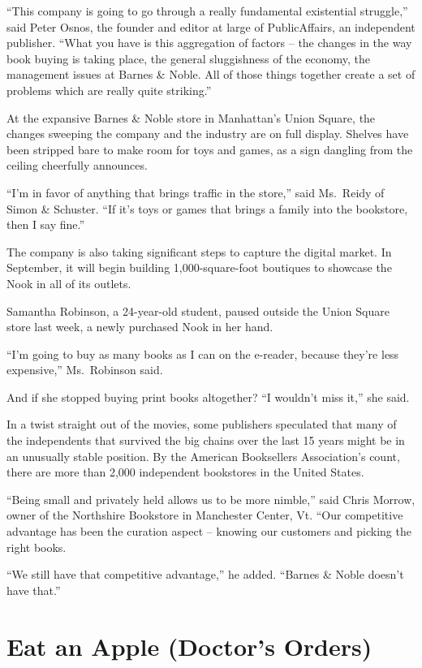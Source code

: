 ﻿\documentclass[12pt]{article}
\begin{document}
``This company is going to go through a really fundamental existential struggle,'' said Peter Osnos,
the founder and editor at large of PublicAffairs, an independent publisher. ``What you have is this
aggregation of factors -- the changes in the way book buying is taking place, the general
sluggishness of the economy, the management issues at Barnes \& Noble. All of those things together
create a set of problems which are really quite striking.''

At the expansive Barnes \& Noble store in Manhattan's Union Square, the changes sweeping the company
and the industry are on full display. Shelves have been stripped bare to make room for toys and
games, as a sign dangling from the ceiling cheerfully announces.

``I'm in favor of anything that brings traffic in the store,'' said Ms.~Reidy of Simon \& Schuster.
``If it's toys or games that brings a family into the bookstore, then I say fine.''

The company is also taking significant steps to capture the digital market. In September, it will
begin building 1,000-square-foot boutiques to showcase the Nook in all of its outlets.

Samantha Robinson, a 24-year-old student, paused outside the Union Square store last week, a newly
purchased Nook in her hand.

``I'm going to buy as many books as I can on the e-reader, because they're less expensive,''
Ms.~Robinson said.

And if she stopped buying print books altogether? ``I wouldn't miss it,'' she said.

In a twist straight out of the movies, some publishers speculated that many of the independents that
survived the big chains over the last 15 years might be in an unusually stable position. By the
American Booksellers Association's count, there are more than 2,000 independent bookstores in the
United States.

``Being small and privately held allows us to be more nimble,'' said Chris Morrow, owner of the
Northshire Bookstore in Manchester Center, Vt. ``Our competitive advantage has been the curation
aspect -- knowing our customers and picking the right books.

``We still have that competitive advantage,'' he added. ``Barnes \& Noble doesn't have that.''

\section{Eat an Apple (Doctor's Orders)}
\end{document}
